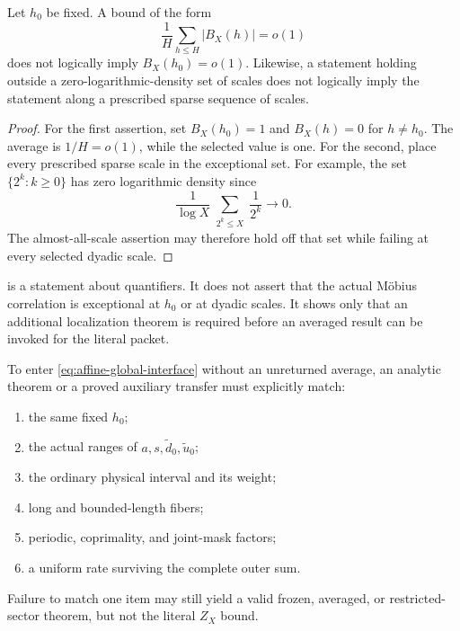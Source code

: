 \begin{proposition}
\label{prop:lit-average-selection}
Let \(h_0\) be fixed.  A bound of the form
\[
 \frac1H\sum_{h\le H}|B_X(h)|=o(1)
\]
does not logically imply \(B_X(h_0)=o(1)\).  Likewise, a statement
holding outside a zero-logarithmic-density set of scales does not
logically imply the statement along a prescribed sparse sequence of
scales.
\end{proposition}

\begin{proof}
For the first assertion, set \(B_X(h_0)=1\) and \(B_X(h)=0\) for
\(h\ne h_0\).  The average is \(1/H=o(1)\), while the selected value
is one.  For the second, place every prescribed sparse scale in the
exceptional set.  For example, the set
\(\{2^k:k\ge0\}\) has zero logarithmic density since
\[
 \frac{1}{\log X}
 \sum_{\substack{2^k\le X}}\frac1{2^k}
 \longrightarrow0.
\]
The almost-all-scale assertion may therefore hold off that set while
failing at every selected dyadic scale.
\end{proof}

\begin{remark}
 is a statement about quantifiers.
It does not assert that the actual M\"obius correlation is exceptional
at \(h_0\) or at dyadic scales.  It shows only that an additional
localization theorem is required before an averaged result can be
invoked for the literal packet.
\end{remark}

\begin{corollary}
\label{cor:lit-callable-checklist}
To enter \eqref{eq:affine-global-interface} without an unreturned
average, an analytic theorem or a proved auxiliary transfer must
explicitly match:
\begin{enumerate}[label=\textup{(\roman*)},leftmargin=2.5em]
 \item the same fixed \(h_0\);
 \item the actual ranges of \(a,s,\widetilde d_0,\widetilde u_0\);
 \item the ordinary physical interval and its weight;
 \item long and bounded-length fibers;
 \item periodic, coprimality, and joint-mask factors;
 \item a uniform rate surviving the complete outer sum.
\end{enumerate}
Failure to match one item may still yield a valid frozen, averaged, or
restricted-sector theorem, but not the literal \(Z_X\) bound.
\end{corollary}
